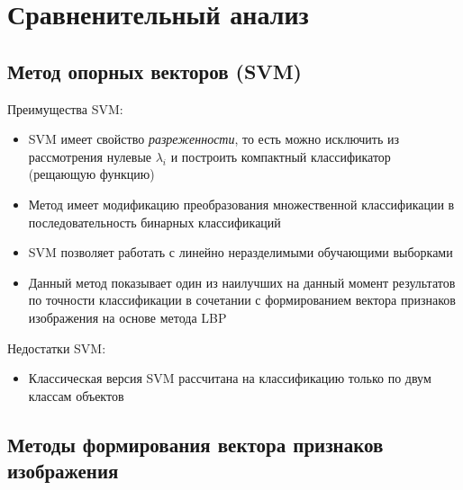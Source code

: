 \documentclass[12pt,a4paper]{article}
\begin{document}
\section{Сравненительный анализ}
\subsection{Метод опорных векторов (SVM)}
Преимущества SVM:
\begin{itemize}
    \item SVM имеет свойство \textit{разреженности}, то есть можно исключить из рассмотрения нулевые $\lambda_i$ и построить компактный классификатор (рещающую функцию)
    \item Метод имеет модификацию преобразования множественной классификации в последовательность бинарных классификаций
    \item SVM позволяет работать с линейно неразделимыми обучающими выборками
    \item Данный метод показывает один из наилучших на данный момент результатов по точности классификации в сочетании с формированием вектора признаков изображения на основе метода LBP
\end{itemize}

Недостатки SVM:
\begin{itemize}
    \item Классическая версия SVM рассчитана на классификацию только по двум классам объектов
\end{itemize}

\subsection{Методы формирования вектора признаков изображения}
\end{document}
